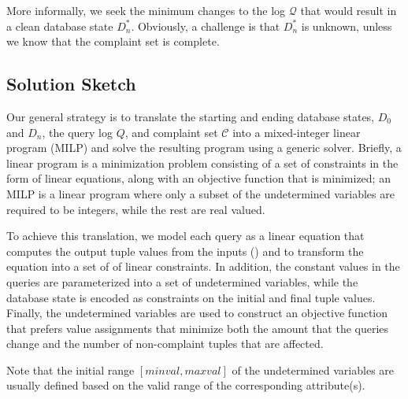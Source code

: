 More informally, we seek the minimum changes to the log $\mathcal{Q}$
that would result in a clean database state $D_n^*$. Obviously, a
challenge is that $D_n^*$ is unknown, unless we know that the
complaint set is complete. 


\subsection{Solution Sketch}

Our general strategy is to translate the starting
and ending database states, $D_0$ and $D_n$, the query log $Q$, and
complaint set $\mathcal{C}$ into a mixed-integer linear program (MILP)
and solve the resulting program using a generic solver.  
Briefly, a linear program is a minimization problem consisting of
a set of constraints in the form of linear equations, along with
an objective function that is minimized; an MILP is a linear program
where only a subset of the undetermined variables are required to
be integers, while the rest are real valued.  

\iffalse
For example, in the following
example, $b$ and $z$ are undetermined integer and real valued variables, respectively,
whereas $x$ is determined to be $1$.  The objective function is $b+z$, 
resulting in the optimal solution $b = z = 1$.

\[
\begin{array}{l l l}
minimize      & b + z\\
\mbox{s.t.}   &x &= b * z \\
              &x &= 1\\
              &b &\in \{0, 1, 2, 3\}\\
              &z &\le 6\\
              &z &\ge 0\\
\end{array}
\]
\fi

To achieve this translation,
we model each query as a linear equation that computes the output
tuple values from the inputs () 
and to transform the equation into a
set of of linear constraints. In addition, the constant values in
the queries are parameterized into a set of undetermined variables,
while the database state is encoded as constraints on the initial
and final tuple values. Finally, the undetermined variables are
used to construct an objective function that prefers value assignments
that minimize both the amount that the queries change and the number
of non-complaint tuples that are affected.

Note that the initial range $[minval, maxval]$ of the 
undetermined variables are usually defined based on
the valid range of the corresponding attribute(s). 

